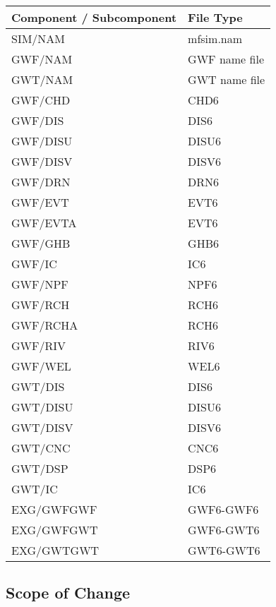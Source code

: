\begin{table}[H]
\caption{Components and subcomponents that are read using Input Data Processor (IDP) routines}
\small
\begin{center}
\begin{longtable}{p{6cm} p{4cm}}
\hline
\hline
\textbf{Component / Subcomponent} & \textbf{File Type} \\
\hline
SIM/NAM & mfsim.nam \\
GWF/NAM & GWF name file \\
GWT/NAM & GWT name file \\
GWF/CHD & CHD6 \\
GWF/DIS & DIS6 \\
GWF/DISU & DISU6 \\
GWF/DISV & DISV6 \\
GWF/DRN & DRN6 \\
GWF/EVT & EVT6 \\
GWF/EVTA & EVT6 \\
GWF/GHB & GHB6 \\
GWF/IC & IC6 \\
GWF/NPF & NPF6 \\
GWF/RCH & RCH6 \\
GWF/RCHA & RCH6 \\
GWF/RIV & RIV6 \\
GWF/WEL & WEL6 \\
GWT/DIS & DIS6 \\
GWT/DISU & DISU6 \\
GWT/DISV & DISV6 \\
GWT/CNC & CNC6 \\
GWT/DSP & DSP6 \\
GWT/IC & IC6 \\
EXG/GWFGWF & GWF6-GWF6 \\
EXG/GWFGWT & GWF6-GWT6 \\
EXG/GWTGWT & GWT6-GWT6 \\
\hline
\end{longtable}
\label{table:idmsupported}
\end{center}
\normalsize
\end{table}

\subsection{Scope of Change}

